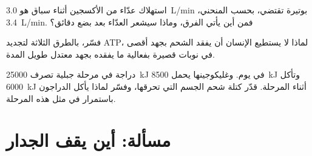 \begin{exercise}[$\star\star\star$]\label{exo:g10:exercise-and-energy:13}
استهلاك عدّاء من الأكسجين أثناء سباق هو \qty{3.0}{L/min} بوتيرة تقتضي،
بحسب المنحني، \qty{3.4}{L/min}. فمن أين يأتي الفرق، وماذا سيشعر
العدّاء بعد بضع دقائق؟
\end{exercise}

\begin{exercise}[$\star\star\star$]\label{exo:g10:exercise-and-energy:14}
فسّر، بالطرق الثلاثة لتجديد ATP، لماذا لا يستطيع الإنسان أن يفقد
الشحم بجهد أقصى في نوبات قصيرة بفعالية ما يفقده بجهد معتدل طويل
المدة.
\end{exercise}

\begin{exercise}[$\star\star\star$]\label{exo:g10:exercise-and-energy:15}
دراجة في مرحلة جبلية تصرف \qty{25000}{kJ} في يوم. وغليكوجينها يحمل
\qty{8500}{kJ} وتأكل \qty{6000}{kJ} أثناء المرحلة. قدّر كتلة شحم
الجسم التي تحرقها، وفسّر لماذا يأكل الدراجون باستمرار في مثل هذه
المرحلة.
\end{exercise}

\section{مسألة: أين يقف الجدار}


